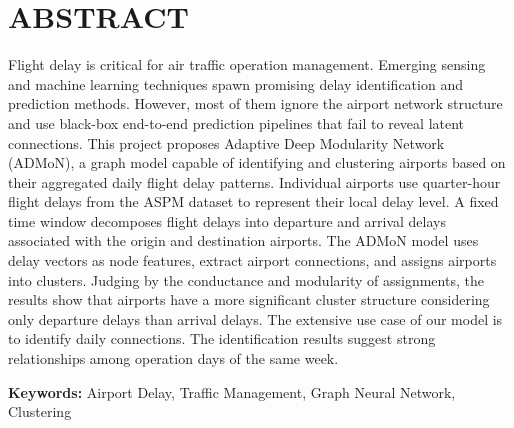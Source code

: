 \chapter*{ABSTRACT}
\pagestyle{fancy}

Flight delay is critical for air traffic operation management. Emerging sensing and machine learning techniques spawn promising delay identification and prediction methods. However, most of them ignore the airport network structure and use black-box end-to-end prediction pipelines that fail to reveal latent connections. This project proposes Adaptive Deep Modularity Network (ADMoN), a graph model capable of identifying and clustering airports based on their aggregated daily flight delay patterns. Individual airports use quarter-hour flight delays from the ASPM dataset to represent their local delay level. A fixed time window decomposes flight delays into departure and arrival delays associated with the origin and destination airports. The ADMoN model uses delay vectors as node features, extract airport connections, and assigns airports into clusters. Judging by the conductance and modularity of assignments, the results show that airports have a more significant cluster structure considering only departure delays than arrival delays. The extensive use case of our model is to identify daily connections. The identification results suggest strong relationships among operation days of the same week.

\smallskip

\noindent\textbf{Keywords:} Airport Delay, Traffic Management, Graph Neural Network, Clustering